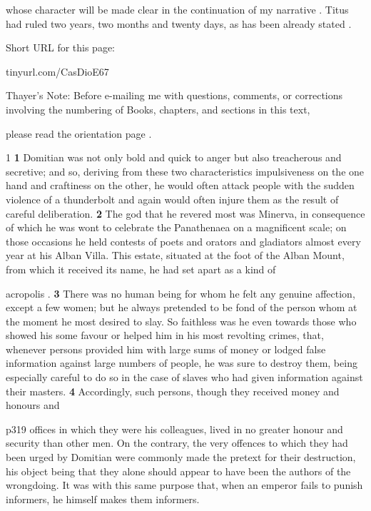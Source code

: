 whose character will be made clear in the continuation of my narrative . Titus had ruled two years, two months and twenty days, as has been already stated .


Short URL for this page:

tinyurl.com/CasDioE67

Thayer's Note: Before e-mailing me with questions, comments, or corrections involving the numbering of Books, chapters, and sections in this text,

please read the orientation page .

1 \textbf{1} Domitian was not only bold and quick to anger but also treacherous and secretive; and so, deriving from these two characteristics impulsiveness on the one hand and craftiness on the other, he would often attack people with the sudden violence of a thunderbolt and again would often injure them as the result of careful deliberation. \textbf{2} The god that he revered most was Minerva, in consequence of which he was wont to celebrate the Panathenaea on a magnificent scale; on those occasions he held contests of poets and orators and gladiators almost every year at his Alban Villa. This estate, situated at the foot of the Alban Mount, from which it received its name, he had set apart as a kind of

acropolis . \textbf{3} There was no human being for whom he felt any genuine affection, except a few women; but he always pretended to be fond of the person whom at the moment he most desired to slay. So faithless was he even towards those who showed his some favour or helped him in his most revolting crimes, that, whenever persons provided him with large sums of money or lodged false information against large numbers of people, he was sure to destroy them, being especially careful to do so in the case of slaves who had given information against their masters. \textbf{4} Accordingly, such persons, though they received money and honours and

p319 offices in which they were his colleagues, lived in no greater honour and security than other men. On the contrary, the very offences to which they had been urged by Domitian were commonly made the pretext for their destruction, his object being that they alone should appear to have been the authors of the wrongdoing. It was with this same purpose that, when an emperor fails to punish informers, he himself makes them informers.

